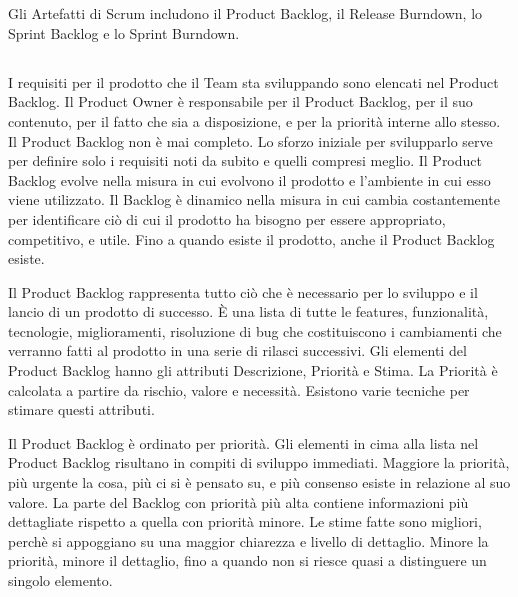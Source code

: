 \section*{\color{Blue}{ARTEFATTI}}
\label{sec:artifacts}
Gli Artefatti di Scrum includono il Product Backlog, il  Release Burndown, lo Sprint Backlog e lo Sprint Burndown.

\subsection*{\color{Blue}{PRODUCT BACKLOG E RELEASE BURNDOWN}}
\label{sec:productbacklog}

I requisiti per il prodotto che il Team sta sviluppando sono elencati nel Product Backlog. Il Product Owner \`e responsabile per il Product Backlog, per il suo contenuto, per il fatto che sia a disposizione, e per
la priorit\`a interne allo stesso. Il Product Backlog non \`e  mai completo. Lo sforzo iniziale per svilupparlo serve per definire solo i requisiti noti da subito e quelli compresi meglio.
Il Product Backlog evolve nella misura in cui evolvono il prodotto e l'ambiente in cui esso viene utilizzato. Il Backlog \`e  dinamico nella misura in cui cambia costantemente per 
identificare ci\`o di cui il prodotto ha bisogno per essere appropriato, competitivo, e utile. Fino a quando esiste il prodotto, anche il Product Backlog esiste.
\newline

Il Product Backlog rappresenta tutto ci\`o che \`e  necessario per lo sviluppo e il lancio di un prodotto di successo. \`E una lista di tutte le features, funzionalit\`a, tecnologie, miglioramenti, risoluzione di bug
che costituiscono i cambiamenti che verranno fatti al prodotto in una serie di rilasci successivi. Gli elementi del Product Backlog hanno gli attributi Descrizione, Priorit\`a e Stima. La Priorit\`a \`e  calcolata a partire 
da rischio, valore e necessit\`a. Esistono varie tecniche per stimare questi attributi.
\newline


Il Product Backlog \`e ordinato per priorit\`a. Gli elementi in cima alla lista nel Product Backlog risultano in compiti di sviluppo immediati. Maggiore la priorit\`a, pi\`u urgente la cosa, pi\`u ci si \`e pensato su, e pi\`u consenso esiste 
in relazione al suo valore. La parte del Backlog con priorit\`a pi\`u alta contiene informazioni pi\`u dettagliate rispetto a quella con priorit\`a minore. Le stime fatte sono migliori, perch\`e si appoggiano su una maggior chiarezza e livello di
dettaglio. Minore la priorit\`a, minore il dettaglio, fino a quando non si riesce quasi a distinguere un singolo elemento.
\newline

